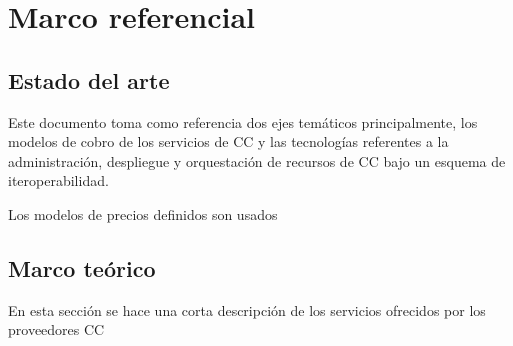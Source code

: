 
\chapter{Marco referencial} %

\label{ch:marcoReferencial} %




\section{Estado del arte}
Este documento toma como referencia dos ejes temáticos principalmente, los modelos de cobro de los servicios de \acrshort{CC} y las tecnologías referentes a la administración, despliegue y orquestación de recursos de \acrshort{CC} bajo un esquema de iteroperabilidad.\bigskip

Los modelos de precios definidos son usados

\section{Marco teórico}
En esta sección se hace una corta descripción de los servicios ofrecidos por los proveedores \acrshort{CC}